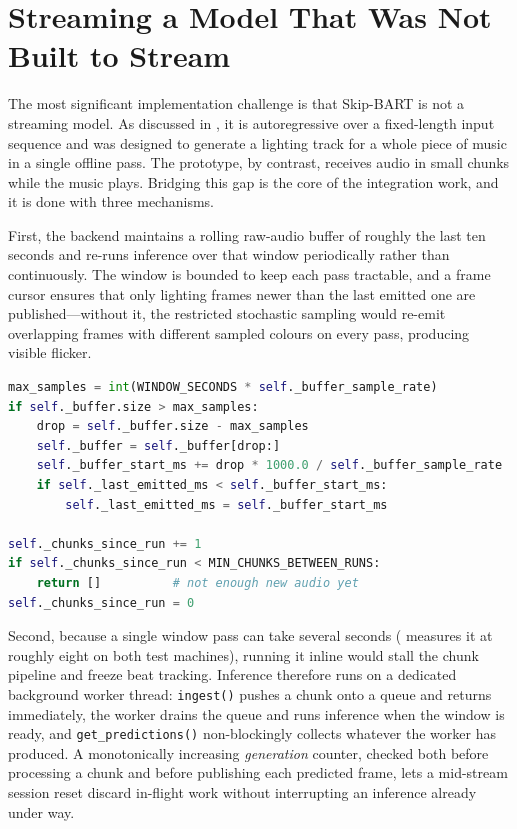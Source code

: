 \section{Streaming a Model That Was Not Built to Stream}
\label{sec:impl-skipbart}

The most significant implementation challenge is that Skip-BART is not a streaming model. As discussed in , it is autoregressive over a fixed-length input sequence and was designed to generate a lighting track for a whole piece of music in a single offline pass. The prototype, by contrast, receives audio in small chunks while the music plays. Bridging this gap is the core of the integration work, and it is done with three mechanisms.

First, the backend maintains a rolling raw-audio buffer of roughly the last ten seconds and re-runs inference over that window periodically rather than continuously. The window is bounded to keep each pass tractable, and a frame cursor ensures that only lighting frames newer than the last emitted one are published---without it, the restricted stochastic sampling would re-emit overlapping frames with different sampled colours on every pass, producing visible flicker.

\begin{lstlisting}[language=Python,caption={Sliding-window gate in the Skip-BART adapter: trim the buffer, advance the emit cursor, and only run inference once enough new audio has accumulated.},label={lst:skip-window}]
max_samples = int(WINDOW_SECONDS * self._buffer_sample_rate)
if self._buffer.size > max_samples:
    drop = self._buffer.size - max_samples
    self._buffer = self._buffer[drop:]
    self._buffer_start_ms += drop * 1000.0 / self._buffer_sample_rate
    if self._last_emitted_ms < self._buffer_start_ms:
        self._last_emitted_ms = self._buffer_start_ms

self._chunks_since_run += 1
if self._chunks_since_run < MIN_CHUNKS_BETWEEN_RUNS:
    return []          # not enough new audio yet
self._chunks_since_run = 0
\end{lstlisting}

Second, because a single window pass can take several seconds ( measures it at roughly eight on both test machines), running it inline would stall the chunk pipeline and freeze beat tracking. Inference therefore runs on a dedicated background worker thread: \texttt{ingest()} pushes a chunk onto a queue and returns immediately, the worker drains the queue and runs inference when the window is ready, and \texttt{get\_predictions()} non-blockingly collects whatever the worker has produced. A monotonically increasing \emph{generation} counter, checked both before processing a chunk and before publishing each predicted frame, lets a mid-stream session reset discard in-flight work without interrupting an inference already under way.

